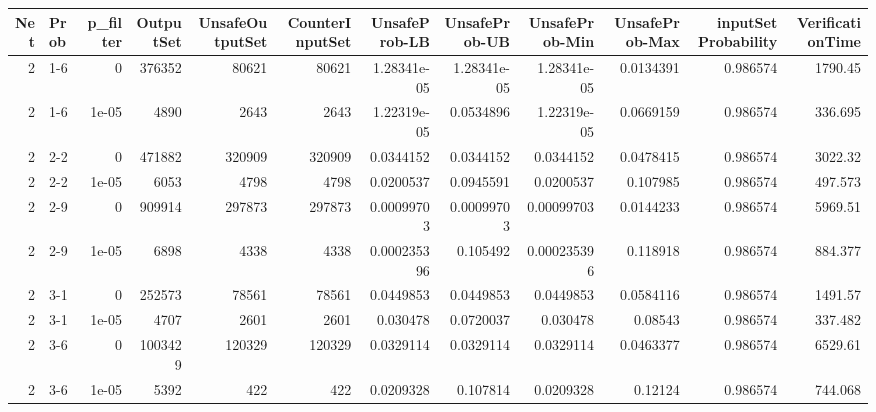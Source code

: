 \begin{tabular}{rlrrrrrrrrrr}
\hline
   Net & Prob   &   p\_filter &   OutputSet &   UnsafeOutputSet &   CounterInputSet &   UnsafeProb-LB &   UnsafeProb-UB &   UnsafeProb-Min &   UnsafeProb-Max &   inputSet Probability &   VerificationTime \\
\hline
     2 & 1-6    &      0     &      376352 &             80621 &             80621 &     1.28341e-05 &     1.28341e-05 &      1.28341e-05 &        0.0134391 &               0.986574 &         1790.45    \\
     2 & 1-6    &      1e-05 &        4890 &              2643 &              2643 &     1.22319e-05 &     0.0534896   &      1.22319e-05 &        0.0669159 &               0.986574 &          336.695   \\
     2 & 2-2    &      0     &      471882 &            320909 &            320909 &     0.0344152   &     0.0344152   &      0.0344152   &        0.0478415 &               0.986574 &         3022.32    \\
     2 & 2-2    &      1e-05 &        6053 &              4798 &              4798 &     0.0200537   &     0.0945591   &      0.0200537   &        0.107985  &               0.986574 &          497.573   \\
     2 & 2-9    &      0     &      909914 &            297873 &            297873 &     0.00099703  &     0.00099703  &      0.00099703  &        0.0144233 &               0.986574 &         5969.51    \\
     2 & 2-9    &      1e-05 &        6898 &              4338 &              4338 &     0.000235396 &     0.105492    &      0.000235396 &        0.118918  &               0.986574 &          884.377   \\
     2 & 3-1    &      0     &      252573 &             78561 &             78561 &     0.0449853   &     0.0449853   &      0.0449853   &        0.0584116 &               0.986574 &         1491.57    \\
     2 & 3-1    &      1e-05 &        4707 &              2601 &              2601 &     0.030478    &     0.0720037   &      0.030478    &        0.08543   &               0.986574 &          337.482   \\
     2 & 3-6    &      0     &     1003429 &            120329 &            120329 &     0.0329114   &     0.0329114   &      0.0329114   &        0.0463377 &               0.986574 &         6529.61    \\
     2 & 3-6    &      1e-05 &        5392 &               422 &               422 &     0.0209328   &     0.107814    &      0.0209328   &        0.12124   &               0.986574 &          744.068   \\

\end{tabular}
